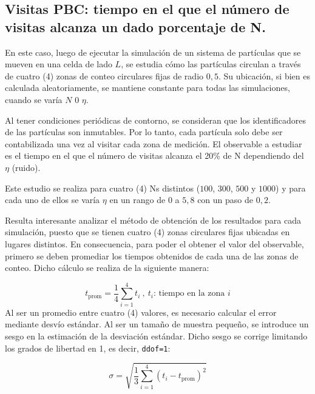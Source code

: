 \documentclass[11pt, a4paper]{article}
\begin{document}
        \subsection{Visitas PBC: tiempo en el que el número de visitas alcanza un dado porcentaje de N.}
        \label{subsec:visitas-pbc}

            En este caso, luego de ejecutar la simulación de un sistema de partículas que se mueven en una celda de lado $L$,
            se estudia cómo las partículas circulan a través de cuatro (4) zonas de conteo circulares fijas de radio $0,5$.
            Su ubicación, si bien es calculada aleatoriamente, se mantiene constante para todas las simulaciones, cuando se varía $N$ 0 $\eta$.

            Al tener condiciones periódicas de contorno, se consideran que los identificadores de las partículas son inmutables.
            Por lo tanto, cada partícula solo debe ser contabilizada una vez al visitar cada zona de medición.
            El observable a estudiar es el tiempo en el que el número de visitas alcanza el 20\% de N dependiendo
            del $\eta$ (ruido).

            Este estudio se realiza para cuatro (4) Ns distintos ($100$, $300$, $500$ y $1000$) y para cada uno de ellos
            se varía $\eta$ en un rango de $0$ a $5,8$ con un paso de $0,2$.

            Resulta interesante analizar el método de obtención de los resultados para cada simulación, puesto que se
            tienen cuatro (4) zonas circulares fijas ubicadas en lugares distintos.
            En consecuencia, para poder el obtener el valor del observable, primero se deben promediar los tiempos obtenidos
            de cada una de las zonas de conteo.
            Dicho cálculo se realiza de la siguiente manera:

            \begin{equation}
                t_{\text{prom}} = \frac{1}{4} \sum_{i=1}^{4} t_i \ ,\ t_i\text{: tiempo en la zona }i
            \end{equation}
            Al ser un promedio entre cuatro (4) valores, es necesario calcular el error mediante desvío estándar.
            Al ser un tamaño de muestra pequeño, se introduce un sesgo en la estimación de la desviación estándar. Dicho sesgo se corrige limitando los grados de libertad en 1, es decir, \texttt{ddof=1}:

            \begin{equation}
                \sigma = \sqrt{\frac{1}{3} \sum_{i=1}^{4} (t_i - t_{\text{prom}})^2}
            \end{equation}
\end{document}
